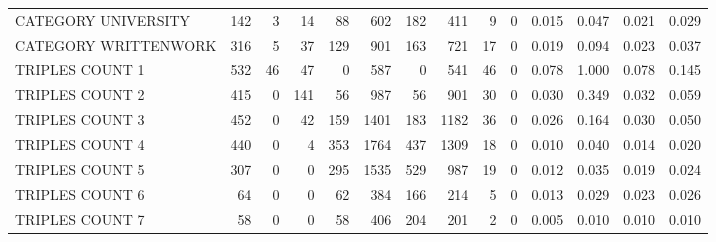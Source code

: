 \begin{tabular}{lrrrrrrrrrllll}
 CATEGORY UNIVERSITY      &             142 &             3 &              14 &              88 &             602 &  182 &  411 &    9 &    0 & 0.015 & 0.047 & 0.021 & 0.029 \\
 CATEGORY WRITTENWORK     &             316 &             5 &              37 &             129 &             901 &  163 &  721 &   17 &    0 & 0.019 & 0.094 & 0.023 & 0.037 \\
 TRIPLES COUNT 1          &             532 &            46 &              47 &               0 &             587 &    0 &  541 &   46 &    0 & 0.078 & 1.000 & 0.078 & 0.145 \\
 TRIPLES COUNT 2          &             415 &             0 &             141 &              56 &             987 &   56 &  901 &   30 &    0 & 0.030 & 0.349 & 0.032 & 0.059 \\
 TRIPLES COUNT 3          &             452 &             0 &              42 &             159 &            1401 &  183 & 1182 &   36 &    0 & 0.026 & 0.164 & 0.030 & 0.050 \\
 TRIPLES COUNT 4          &             440 &             0 &               4 &             353 &            1764 &  437 & 1309 &   18 &    0 & 0.010 & 0.040 & 0.014 & 0.020 \\
 TRIPLES COUNT 5          &             307 &             0 &               0 &             295 &            1535 &  529 &  987 &   19 &    0 & 0.012 & 0.035 & 0.019 & 0.024 \\
 TRIPLES COUNT 6          &              64 &             0 &               0 &              62 &             384 &  166 &  214 &    5 &    0 & 0.013 & 0.029 & 0.023 & 0.026 \\
 TRIPLES COUNT 7          &              58 &             0 &               0 &              58 &             406 &  204 &  201 &    2 &    0 & 0.005 & 0.010 & 0.010 & 0.010 \\
\hline
\end{tabular}